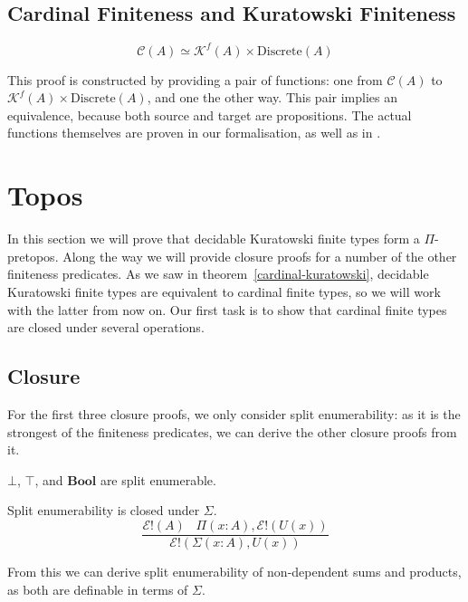 \subsection{Cardinal Finiteness and Kuratowski Finiteness}
\begin{lemma} \label{cardinal-kuratowski}
  \begin{equation}
    \mathcal{C}(A) \simeq \mathcal{K}^f(A) \times \text{Discrete}(A)
  \end{equation}
\end{lemma}
This proof is constructed by providing a pair of functions: one from
\(\mathcal{C}(A)\) to \(\mathcal{K}^f(A) \times \text{Discrete}(A)\), and one the
other way.
This pair implies an equivalence, because both source and target are
propositions.
The actual functions themselves are proven in our formalisation, as well as in
\cite{fruminFiniteSetsHomotopy2018}.
\section{Topos} \label{topos}
In this section we will prove that decidable Kuratowski finite types form a
\(\Pi\)-pretopos.
Along the way we will provide closure proofs for a number of the other
finiteness predicates.
As we saw in theorem~\ref{cardinal-kuratowski}, decidable Kuratowski finite
types are equivalent to cardinal finite types, so we will work with the latter
from now on.
Our first task is to show that cardinal finite types are closed under several
operations.
\subsection{Closure}
For the first three closure proofs, we only consider split enumerability:
as it is the strongest of the finiteness predicates, we can derive the other
closure proofs from it.

\begin{lemma}
  \(\bot\), \(\top\), and \(\mathbf{Bool}\) are split enumerable.
\end{lemma}
\begin{lemma} \label{split-enum-sigma}
  Split enumerability is closed under \(\Sigma\).
  \begin{equation}
    \frac{
      \mathcal{E}!(A) \; \; \; \Pi(x : A) , \mathcal{E}!(U(x))
    }{
      \mathcal{E}!(\Sigma(x : A) , U(x))
    }
  \end{equation}
\end{lemma}
From this we can derive split enumerability of non-dependent sums and products,
as both are definable in terms of \(\Sigma\).


